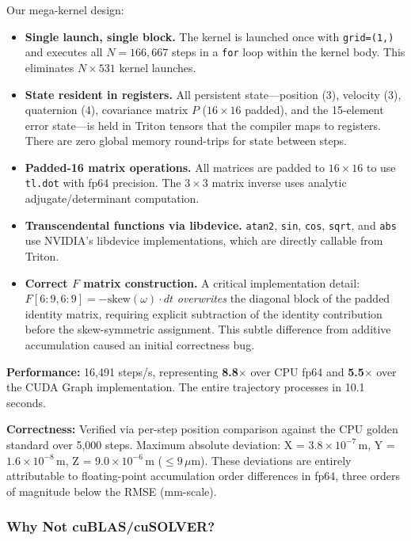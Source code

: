 \documentclass[pdflatex,sn-mathphys-num]{sn-jnl}%
\theoremstyle{thmstyleone}%
\theoremstyle{thmstyletwo}%
\theoremstyle{thmstylethree}%
\begin{document}
Our mega-kernel design:

\begin{itemize}
\item \textbf{Single launch, single block.} The kernel is launched once with \texttt{grid=(1,)} and executes all $N = 166{,}667$ steps in a \texttt{for} loop within the kernel body. This eliminates $N \times 531$ kernel launches.
\item \textbf{State resident in registers.} All persistent state---position (3), velocity (3), quaternion (4), covariance matrix $P$ ($16\times16$ padded), and the 15-element error state---is held in Triton tensors that the compiler maps to registers. There are zero global memory round-trips for state between steps.
\item \textbf{Padded-16 matrix operations.} All matrices are padded to $16\times16$ to use \texttt{tl.dot} with fp64 precision. The $3\times3$ matrix inverse uses analytic adjugate/determinant computation.
\item \textbf{Transcendental functions via libdevice.} \texttt{atan2}, \texttt{sin}, \texttt{cos}, \texttt{sqrt}, and \texttt{abs} use NVIDIA's libdevice implementations, which are directly callable from Triton.
\item \textbf{Correct $F$ matrix construction.} A critical implementation detail: $F[6{:}9,6{:}9] = -\text{skew}(\omega) \cdot dt$ \textit{overwrites} the diagonal block of the padded identity matrix, requiring explicit subtraction of the identity contribution before the skew-symmetric assignment. This subtle difference from additive accumulation caused an initial correctness bug.
\end{itemize}

\textbf{Performance:} 16,491 steps/s, representing \textbf{8.8$\times$} over CPU fp64 and \textbf{5.5$\times$} over the CUDA Graph implementation. The entire trajectory processes in 10.1 seconds.

\textbf{Correctness:} Verified via per-step position comparison against the CPU golden standard over 5,000 steps. Maximum absolute deviation: X = $3.8 \times 10^{-7}$\,m, Y = $1.6 \times 10^{-8}$\,m, Z = $9.0 \times 10^{-6}$\,m ($\leq 9\,\mu$m). These deviations are entirely attributable to floating-point accumulation order differences in fp64, three orders of magnitude below the RMSE (mm-scale).

\subsubsection{Why Not cuBLAS/cuSOLVER?}
\end{document}
